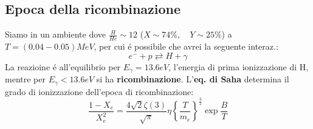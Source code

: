 \documentclass[12pt, a4paper]{article}
\begin{document}
\subsection{Epoca della ricombinazione}
Siamo in un ambiente dove $\frac{H}{He}\sim 12$ ($X\sim 74\%, \quad
Y\sim 25\%$) a $T=(0.04 - 0.05)MeV$, per cui \'{e} possibile che avrei la seguente interaz.:
\begin{equation}
       e^{-} + p \rightleftarrows H + \gamma
\end{equation}
La reazioine \'{e} all'equilibrio per $E_{\gamma}=13.6 eV$, l'energia di prima ionizzazione di H, mentre per $E_{\gamma}<13.6 eV$ si ha \textbf{ricombinazione}. L'\textbf{eq. di Saha} determina il grado di ionizzazione dell'epoca di ricombinazione:
\begin{equation}
\frac{1-X_e}{X_e^2}=\frac{4\sqrt{2} \zeta(3)}{\sqrt{\pi}}\eta \left\{ \frac{T}{m_e}\right\}^{\frac{3}{2}} \exp{\frac{B}{T}}
\end{equation}
\end{document}
